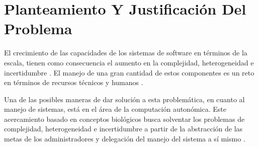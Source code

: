 \documentclass[12pt]{article}
\begin{document}

    


    \pagebreak

    \section{Planteamiento Y Justificación Del Problema}
    
    

    El crecimiento de las capacidades de los sistemas de software en términos de la escala, tienen como consecuencia el aumento en la complejidad, heterogeneidad e incertidumbre \cite{emerging_2005}. El manejo de una gran cantidad de estos componentes es un reto en términos de recursos técnicos y humanos \cite[pp.~4-5]{horn_2001}. 
    
    Una de las posibles maneras de dar solución a esta problemática, en cuanto al manejo de sistemas, está en el área de la computación autonómica. Este acercamiento basado en conceptos biológicos busca solventar los problemas de complejidad, heterogeneidad e incertidumbre \cite{emerging_2005} a partir de la abstracción de las metas de los administradores y delegación del manejo del sistema a sí mismo \cite{lalanda_diaconescu_mccann_2014}.
    
\end{document}
